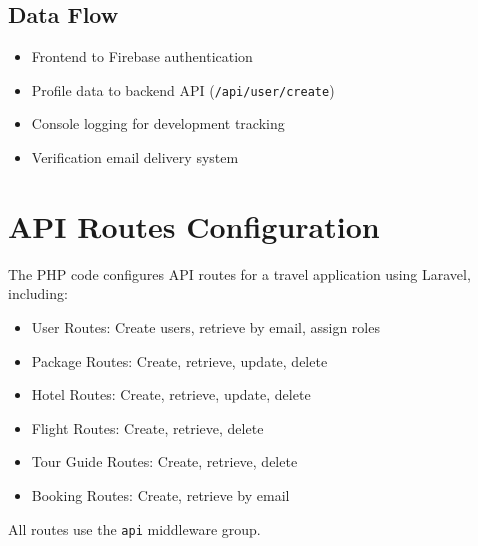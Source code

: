 \subsection{Data Flow}
\begin{itemize}
    \item Frontend to Firebase authentication
    \item Profile data to backend API (\texttt{/api/user/create})
    \item Console logging for development tracking
    \item Verification email delivery system
\end{itemize}

\section{API Routes Configuration}

The PHP code configures API routes for a travel application using Laravel, including:

\begin{itemize}
    \item User Routes: Create users, retrieve by email, assign roles
    \item Package Routes: Create, retrieve, update, delete  
    \item Hotel Routes: Create, retrieve, update, delete
    \item Flight Routes: Create, retrieve, delete
    \item Tour Guide Routes: Create, retrieve, delete
    \item Booking Routes: Create, retrieve by email
\end{itemize}

All routes use the \texttt{api} middleware group.


